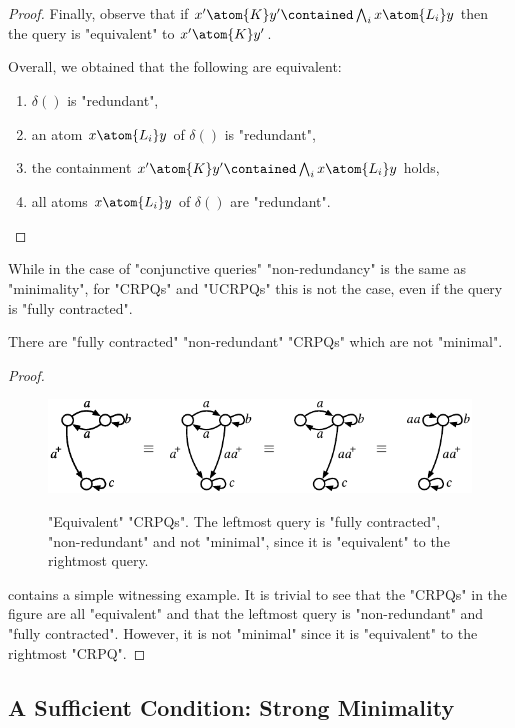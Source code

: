 \begin{proof}
	 Finally, observe that if $x' \atom{K} y' \contained \bigwedge_i x \atom{L_i} y$ then the query is "equivalent" to $x' \atom{K} y'$.

	Overall, we obtained that the following are equivalent:
	\begin{enumerate}[label=\roman*.]
		\item $\delta()$ is "redundant",
		\item an atom $x \atom{L_i} y$ of $\delta()$ is "redundant",
		\item the containment $x' \atom{K} y' \contained \bigwedge_i x \atom{L_i} y$ holds,
		\item all atoms $x \atom{L_i} y$ of $\delta()$ are "redundant".\qedhere
	\end{enumerate}
\end{proof}

While in the case of "conjunctive queries" "non-redundancy" is the same as "minimality", for "CRPQs" and "UCRPQs" this is not the case, even if the query is "fully contracted". 

\begin{proposition}
	There are "fully contracted" "non-redundant" "CRPQs" which are not "minimal".
\end{proposition}

\begin{proof}
	\begin{figure}
		\includegraphics[scale=.8]{fig/minimization-crpq/ex-equiv-queries.pdf}
		\caption{"Equivalent" "CRPQs". The leftmost query is "fully contracted", "non-redundant" and not "minimal", since it is "equivalent" to the rightmost query.}
		\AP\label{fig:ex-equiv-queries}
	\end{figure}
	 contains a simple witnessing example. It is trivial to see that the "CRPQs" in the figure are all "equivalent" and that the leftmost query is "non-redundant" and "fully contracted". However, it is not "minimal" since it is "equivalent" to the rightmost "CRPQ".
\end{proof}

\subsection{A Sufficient Condition: Strong Minimality}

